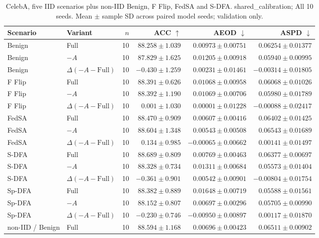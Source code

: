 \begin{table}[t]
\centering
\small
\caption{CelebA, five IID scenarios plus non-IID Benign, F Flip, FedSA and S-DFA. shared\_calibration; All 10 seeds. Mean $\pm$ sample SD across paired model seeds; validation only.}
\begin{tabular}{llrrrr}
\toprule
Scenario & Variant & $n$ & ACC $\uparrow$ & AEOD $\downarrow$ & ASPD $\downarrow$ \\
\midrule
Benign & Full & 10 & $88.258 \pm 1.039$ & $0.00973 \pm 0.00751$ & $0.06254 \pm 0.01377$ \\
Benign & $-A$ & 10 & $87.829 \pm 1.625$ & $0.01205 \pm 0.00918$ & $0.05940 \pm 0.00995$ \\
Benign & $\Delta(-A-\mathrm{Full})$ & 10 & $-0.430 \pm 1.259$ & $0.00231 \pm 0.01461$ & $-0.00314 \pm 0.01805$ \\
F Flip & Full & 10 & $88.391 \pm 0.626$ & $0.01068 \pm 0.00958$ & $0.06068 \pm 0.01026$ \\
F Flip & $-A$ & 10 & $88.392 \pm 1.190$ & $0.01069 \pm 0.00706$ & $0.05980 \pm 0.01789$ \\
F Flip & $\Delta(-A-\mathrm{Full})$ & 10 & $0.001 \pm 1.030$ & $0.00001 \pm 0.01228$ & $-0.00088 \pm 0.02417$ \\
FedSA & Full & 10 & $88.470 \pm 0.909$ & $0.00607 \pm 0.00416$ & $0.06402 \pm 0.01425$ \\
FedSA & $-A$ & 10 & $88.604 \pm 1.348$ & $0.00543 \pm 0.00508$ & $0.06543 \pm 0.01689$ \\
FedSA & $\Delta(-A-\mathrm{Full})$ & 10 & $0.134 \pm 0.985$ & $-0.00065 \pm 0.00662$ & $0.00141 \pm 0.01497$ \\
S-DFA & Full & 10 & $88.689 \pm 0.809$ & $0.00769 \pm 0.00463$ & $0.06377 \pm 0.00697$ \\
S-DFA & $-A$ & 10 & $88.328 \pm 0.734$ & $0.01311 \pm 0.00684$ & $0.05573 \pm 0.01404$ \\
S-DFA & $\Delta(-A-\mathrm{Full})$ & 10 & $-0.361 \pm 0.901$ & $0.00542 \pm 0.00901$ & $-0.00804 \pm 0.01754$ \\
Sp-DFA & Full & 10 & $88.382 \pm 0.889$ & $0.01648 \pm 0.00719$ & $0.05588 \pm 0.01561$ \\
Sp-DFA & $-A$ & 10 & $88.152 \pm 0.807$ & $0.00697 \pm 0.00296$ & $0.05705 \pm 0.00990$ \\
Sp-DFA & $\Delta(-A-\mathrm{Full})$ & 10 & $-0.230 \pm 0.746$ & $-0.00950 \pm 0.00897$ & $0.00117 \pm 0.01870$ \\
non-IID / Benign & Full & 10 & $88.594 \pm 1.168$ & $0.00696 \pm 0.00423$ & $0.06511 \pm 0.00902$ \\

\end{tabular}
\end{table}
